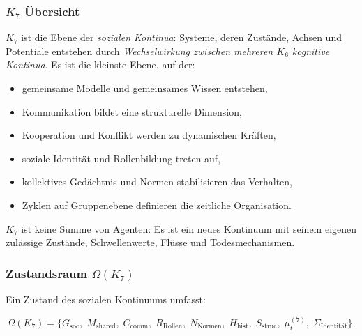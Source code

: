 

\subsubsection{\texorpdfstring{$K_7$}{K_7} Übersicht}
\label{sec:k7-overview}

$K_7$ ist die Ebene der \emph{sozialen Kontinua}: Systeme, deren Zustände,
Achsen und Potentiale entstehen durch \emph{Wechselwirkung zwischen mehreren $K_6$
kognitive Kontinua}. Es ist die kleinste Ebene, auf der:

\begin{itemize}
    \item gemeinsame Modelle und gemeinsames Wissen entstehen,
    \item Kommunikation bildet eine strukturelle Dimension,
    \item Kooperation und Konflikt werden zu dynamischen Kräften,
    \item soziale Identität und Rollenbildung treten auf,
    \item kollektives Gedächtnis und Normen stabilisieren das Verhalten,
    \item Zyklen auf Gruppenebene definieren die zeitliche Organisation.
\end{itemize}

$K_7$ ist keine Summe von Agenten: Es ist ein neues Kontinuum mit seinem eigenen
zulässige Zustände, Schwellenwerte, Flüsse und Todesmechanismen.

\subsubsection{Zustandsraum \texorpdfstring{$\Omega(K_7)$}{\Omega(K_7)}}

Ein Zustand des sozialen Kontinuums umfasst:

\[
\Omega(K_7)=
\{
G_{\mathrm{soc}},\;
M_{\mathrm{shared}},\;
C_{\mathrm{comm}},\;
R_{\mathrm{Rollen}},\;
N_{\mathrm{Normen}},\;
H_{\mathrm{hist}},\;
S_{\mathrm{struc}},\;
\mu^{(7)}_t,\;
\Sigma_{\mathrm{Identität}}
\}.
\]

